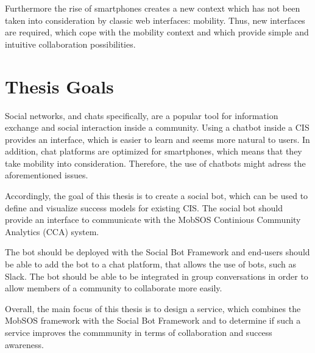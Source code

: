 Furthermore the rise of smartphones creates a new context which has not been taken into consideration by classic web interfaces: mobility.
Thus, new interfaces are required, which cope with the mobility context and which provide simple and intuitive collaboration possibilities.

\section{Thesis Goals}

Social networks, and chats specifically, are a popular tool for information exchange and social interaction inside a community.
Using a chatbot inside a CIS provides an interface, which is easier to learn and seems more natural to users.
In addition, chat platforms are optimized for smartphones, which means that they take mobility into consideration. Therefore, the use of chatbots might adress the aforementioned issues.

Accordingly, the goal of this thesis is to create a social bot, which can be used to define and visualize success models for existing CIS. The social bot should provide an interface to communicate with the MobSOS Continious Community Analytics (CCA) system.

The bot should be deployed with the Social Bot Framework and end-users should be able to add the bot to a chat platform, that allows the use of bots, such as Slack.
The bot should be able to be integrated in group conversations in order to allow members of a community to collaborate more easily.

Overall, the main focus of this thesis is to design a service, which combines the MobSOS framework with the Social Bot Framework and to determine if such a service improves the commmunity in terms of collaboration and success awareness.



